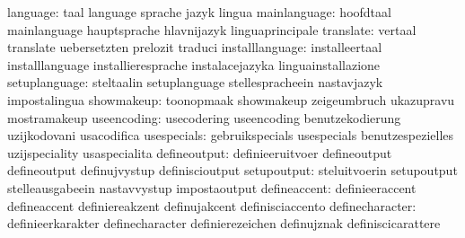                         language: taal                             language
                                  sprache                          jazyk
                                  lingua
                    mainlanguage: hoofdtaal                        mainlanguage
                                  hauptsprache                     hlavnijazyk
                                  linguaprincipale
                       translate: vertaal                          translate
                                  uebersetzten                     prelozit
                                  traduci
                 installlanguage: installeertaal                   installlanguage
                                  installieresprache               instalacejazyka
                                  linguainstallazione
                   setuplanguage: steltaalin                       setuplanguage
                                  stellespracheein                 nastavjazyk
                                  impostalingua                    %
                      showmakeup: toonopmaak                       showmakeup
                                  zeigeumbruch                     ukazupravu
                                  mostramakeup                     %
                     useencoding: usecodering                      useencoding
                                  benutzekodierung                 uzijkodovani
                                  usacodifica
                     usespecials: gebruikspecials                  usespecials
                                  benutzespezielles                uzijspeciality
                                  usaspecialita                    %
                    defineoutput: definieeruitvoer                 defineoutput
                                  defineoutput                     definujvystup
                                  definiscioutput                  %
                     setupoutput: steluitvoerin                    setupoutput
                                  stelleausgabeein                 nastavvystup
                                  impostaoutput                    %
                    defineaccent: definieeraccent                  defineaccent
                                  definiereakzent                  definujakcent
                                  definisciaccento
                 definecharacter: definieerkarakter                definecharacter
                                  definierezeichen                 definujznak
                                  definiscicarattere
